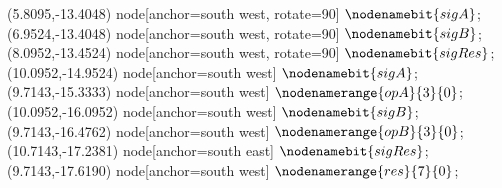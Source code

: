    (5.8095,-13.4048) node[anchor=south west, rotate=90] {$\nodenamebit{sigA}$};
   (6.9524,-13.4048) node[anchor=south west, rotate=90] {$\nodenamebit{sigB}$};
   (8.0952,-13.4524) node[anchor=south west, rotate=90] {$\nodenamebit{sigRes}$};
   (10.0952,-14.9524) node[anchor=south west] {$\nodenamebit{sigA}$};
   (9.7143,-15.3333) node[anchor=south west] {$\nodenamerange{opA}{3}{0}$};
   (10.0952,-16.0952) node[anchor=south west] {$\nodenamebit{sigB}$};
   (9.7143,-16.4762) node[anchor=south west] {$\nodenamerange{opB}{3}{0}$};
   (10.7143,-17.2381) node[anchor=south east] {$\nodenamebit{sigRes}$};
   (9.7143,-17.6190) node[anchor=south west] {$\nodenamerange{res}{7}{0}$};
